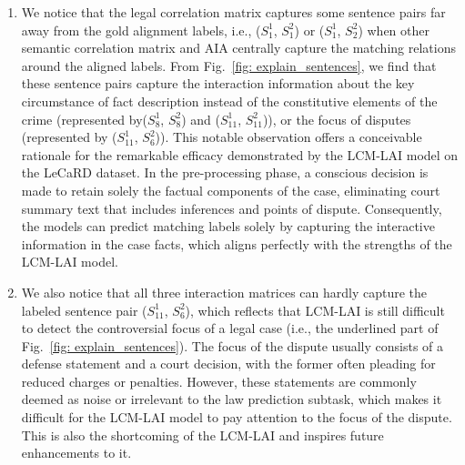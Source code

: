\begin{enumerate}
    \item {
    We notice that the legal correlation matrix captures some sentence pairs far away from the gold alignment labels, i.e., ($S_{1}^{1}$, $S_{1}^{2}$) or ($S_{1}^{1}$, $S_{2}^{2}$) when other semantic correlation matrix and AIA centrally capture the matching relations around the aligned labels.
    From Fig.~\ref{fig: explain_sentences}, we find that these sentence pairs capture the interaction information about the key circumstance of fact description instead of the constitutive elements of the crime (represented by($S_{8}^{1}$, $S_{8}^{2}$) and ($S_{11}^{1}$, $S_{11}^{2}$)), or the focus of disputes (represented by ($S_{11}^{1}$, $S_{6}^{2}$)).
    This notable observation offers a conceivable rationale for the remarkable efficacy demonstrated by the LCM-LAI model on the LeCaRD dataset. 
    In the pre-processing phase, a conscious decision is made to retain solely the factual components of the case, eliminating court summary text that includes inferences and points of dispute. Consequently, the models can predict matching labels solely by capturing the interactive information in the case facts, which aligns perfectly with the strengths of the LCM-LAI model.
    }
    
    \item {
    We also notice that all three interaction matrices can hardly capture the labeled sentence pair ($S_{11}^{1}$, $S_{6}^{2}$), which reflects that LCM-LAI is still difficult to detect the controversial focus of a legal case (i.e., the underlined part of Fig.~\ref{fig: explain_sentences}).
    The focus of the dispute usually consists of a defense statement and a court decision, with the former often pleading for reduced charges or penalties.
    However, these statements are commonly deemed as noise or irrelevant to the law prediction subtask, which makes it difficult for the LCM-LAI model to pay attention to the focus of the dispute. 
    This is also the shortcoming of the LCM-LAI and inspires future enhancements to it.
    }
\end{enumerate}

